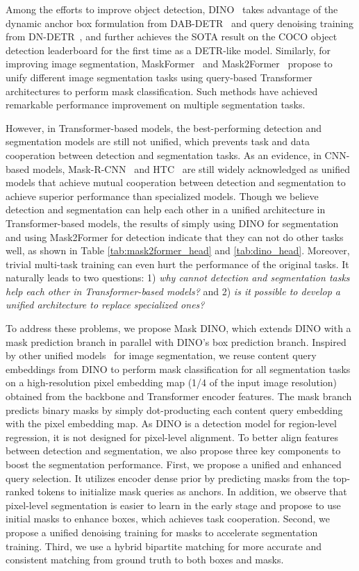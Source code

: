 \documentclass[10pt,twocolumn,letterpaper]{article}
\begin{document}
Among the efforts to improve object detection, DINO~\cite{zhang2022dino} takes advantage of the dynamic anchor box formulation from DAB-DETR~\cite{liu2022dab} and query denoising training from DN-DETR~\cite{li2022dn}, and further 
achieves the SOTA result on the COCO object detection leaderboard for the first time as a DETR-like model. Similarly, for improving image segmentation, MaskFormer~\cite{cheng2021maskformer} and Mask2Former~\cite{cheng2021mask2former} propose to unify different image segmentation tasks using query-based Transformer architectures to perform mask classification. Such methods have achieved remarkable performance improvement on multiple segmentation tasks.

However, in Transformer-based models, the best-performing detection and segmentation models are still not unified, which 
prevents task and data cooperation between detection and segmentation tasks.
As an evidence, in CNN-based models, Mask-R-CNN~\cite{he2017mask} and HTC~\cite{chen2019hybrid} are still widely acknowledged as unified models that achieve mutual cooperation between detection and segmentation to achieve superior performance than specialized models.
Though we believe detection and segmentation can help each other in a unified architecture in Transformer-based models, the results of simply using DINO for segmentation and using Mask2Former for detection indicate that they can not do other tasks well, as shown in Table \ref{tab:mask2former_head} and \ref{tab:dino_head}. Moreover, trivial multi-task training can even hurt the performance of the original tasks. It naturally leads to two questions: 1) \emph{why cannot detection and segmentation tasks help each other in Transformer-based models?} and 2) \emph{is it possible to develop a unified architecture 
to replace specialized ones?}

To address these problems, we propose Mask DINO, which extends DINO with a mask prediction branch in parallel with DINO's box prediction branch. Inspired by other unified models~\cite{wang2021max,cheng2021maskformer,cheng2021mask2former} for image segmentation, we reuse content query embeddings from DINO to perform mask classification for all segmentation tasks on a high-resolution pixel embedding map (1/4 of the input image resolution) obtained from the backbone and Transformer encoder features. 
The mask branch predicts binary masks by simply dot-producting each content query embedding with the pixel embedding map. 
As DINO is a detection model for region-level regression, it is not designed for pixel-level alignment.
To better align features between detection and segmentation, we also propose three key components to boost the segmentation performance.
First, we propose a unified and enhanced query selection. It utilizes encoder dense prior by predicting masks from the top-ranked tokens to initialize mask queries as anchors. In addition, we observe that pixel-level segmentation is easier to learn in the early stage and propose to use initial masks to enhance boxes, which achieves task cooperation. Second, we propose a unified denoising training for masks to accelerate segmentation training. 
Third, we use a hybrid bipartite matching for more accurate and consistent matching from ground truth to both boxes and masks.
\end{document}
